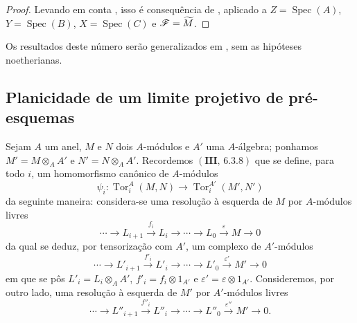 \begin{proof}
Levando em conta , isso é consequência de , aplicado a $Z=\operatorname{Spec}(A)$, $Y=\operatorname{Spec}(B)$, $X=\operatorname{Spec}(C)$ e $\mathscr{F}=\widetilde M$.
\end{proof}

Os resultados deste número serão generalizados em , sem as hipóteses noetherianas.

\subsection{Planicidade de um limite projetivo de pré-esquemas}
\label{subsection:IV.11.2}

\begin{env}[11.2.1]
\label{IV.11.2.1}
Sejam $A$ um anel, $M$ e $N$ dois $A$-módulos e $A'$ uma $A$-álgebra; ponhamos $M'=M\otimes_AA'$ e $N'=N\otimes_AA'$. Recordemos $(\mathbf{III},\,6.3.8)$ que se define, para todo $i$, um homomorfismo canônico de $A$-módulos
\begin{equation}
  \psi_i:\operatorname{Tor}_i^A(M,N)\to\operatorname{Tor}_i^{A'}(M',N')
  \label{IV.11.2.1.1}
  \tag{11.2.1.1}
\end{equation}
da seguinte maneira: considera-se uma resolução à esquerda de $M$ por $A$-módulos livres
\begin{equation}
  \cdots\longrightarrow L_{i+1}\xrightarrow{f_i}L_i\longrightarrow\cdots
  \longrightarrow L_0\xrightarrow{\varepsilon}M\longrightarrow0
  \label{IV.11.2.1.2}
  \tag{11.2.1.2}
\end{equation}
da qual se deduz, por tensorização com $A'$, um complexo de $A'$-módulos
\begin{equation}
  \cdots\longrightarrow L'_{i+1}\xrightarrow{f'_i}L'_i\longrightarrow\cdots
  \longrightarrow L'_0\xrightarrow{\varepsilon'}M'\longrightarrow0
  \label{IV.11.2.1.3}
  \tag{11.2.1.3}
\end{equation}
em que se pôs $L'_i=L_i\otimes_AA'$, $f'_i=f_i\otimes1_{A'}$ e $\varepsilon'=\varepsilon\otimes1_{A'}$. Consideremos, por outro lado, uma resolução à esquerda de $M'$ por $A'$-módulos livres
\begin{equation}
  \cdots\longrightarrow L''_{i+1}\xrightarrow{f''_i}L''_i\longrightarrow\cdots
  \longrightarrow L''_0\xrightarrow{\varepsilon''}M'\longrightarrow0.
  \label{IV.11.2.1.4}
  \tag{11.2.1.4}
\end{equation}
\end{env}

